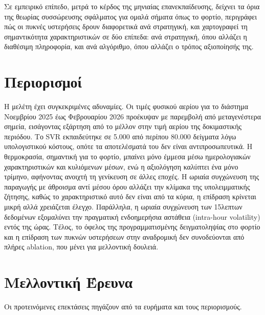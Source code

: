 Σε εμπειρικό επίπεδο, μετρά το κέρδος της μηνιαίας επανεκπαίδευσης, δείχνει τα όρια της
θεωρίας συσσώρευσης σφάλματος για ομαλά σήματα όπως το φορτίο, περιγράφει πώς οι πυκνές
υστερήσεις δρουν διαφορετικά ανά στρατηγική, και χαρτογραφεί τη σημαντικότητα χαρακτηριστικών
σε δύο επίπεδα: ανά στρατηγική, όπου αλλάζει η διαθέσιμη πληροφορία, και ανά αλγόριθμο, όπου
αλλάζει ο τρόπος αξιοποίησής της.

\section{Περιορισμοί}
\label{sec:conc_limitations}

Η μελέτη έχει συγκεκριμένες αδυναμίες. Οι τιμές φυσικού αερίου για το διάστημα Νοεμβρίου 
2025 έως Φεβρουαρίου 2026 προέκυψαν με παρεμβολή από μεταγενέστερα σημεία, εισάγοντας 
εξάρτηση από το μέλλον στην τιμή αερίου της δοκιμαστικής περιόδου. Το SVR εκπαιδεύτηκε 
σε 5.000 από περίπου 80.000 δείγματα λόγω υπολογιστικού κόστους, οπότε τα αποτελέσματά του 
δεν είναι αντιπροσωπευτικά. Η θερμοκρασία, σημαντική για το φορτίο, μπαίνει μόνο έμμεσα 
μέσω ημερολογιακών χαρακτηριστικών και κυλιόμενων μέσων, ενώ η αξιολόγηση καλύπτει ένα μόνο 
τρίμηνο, αφήνοντας ανοιχτή τη γενίκευση σε άλλες εποχές. Η ωριαία συγχώνευση της παραγωγής με 
άθροισμα αντί μέσου όρου αλλάζει την κλίμακα της υπολειμματικής ζήτησης, καθώς το χαρακτηριστικό αυτό
δεν είναι από τα κύρια, η επίδραση κρίνεται μικρή αλλά χρειάζεται έλεγχο.
Παράλληλα, η ωριαία συγχώνευση των 15λεπτων δεδομένων εξομαλύνει την πραγματική ενδοημερήσια 
αστάθεια (intra-hour volatility) εντός της ώρας. Τέλος, το όφελος της προγραμματισμένης δειγματοληψίας
στο φορτίο και η επίδραση των πυκνών υστερήσεων στην αναδρομική δεν συνοδεύονται από πλήρες ablation, που 
μένει για μελλοντική δουλειά.

\section{Μελλοντική Έρευνα}
\label{sec:conc_future}

Οι προτεινόμενες επεκτάσεις πηγάζουν από τα ευρήματα και τους περιορισμούς.

